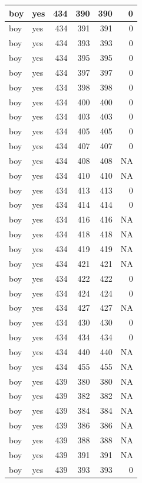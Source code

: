 \documentclass[man]{apa6}
\begin{document}
\begin{tabular}{l|l|r|r|r|r}
\hline
boy & yes & 434 & 390 & 390 & 0\\
\hline
boy & yes & 434 & 391 & 391 & 0\\
\hline
boy & yes & 434 & 393 & 393 & 0\\
\hline
boy & yes & 434 & 395 & 395 & 0\\
\hline
boy & yes & 434 & 397 & 397 & 0\\
\hline
boy & yes & 434 & 398 & 398 & 0\\
\hline
boy & yes & 434 & 400 & 400 & 0\\
\hline
boy & yes & 434 & 403 & 403 & 0\\
\hline
boy & yes & 434 & 405 & 405 & 0\\
\hline
boy & yes & 434 & 407 & 407 & 0\\
\hline
boy & yes & 434 & 408 & 408 & NA\\
\hline
boy & yes & 434 & 410 & 410 & NA\\
\hline
boy & yes & 434 & 413 & 413 & 0\\
\hline
boy & yes & 434 & 414 & 414 & 0\\
\hline
boy & yes & 434 & 416 & 416 & NA\\
\hline
boy & yes & 434 & 418 & 418 & NA\\
\hline
boy & yes & 434 & 419 & 419 & NA\\
\hline
boy & yes & 434 & 421 & 421 & NA\\
\hline
boy & yes & 434 & 422 & 422 & 0\\
\hline
boy & yes & 434 & 424 & 424 & 0\\
\hline
boy & yes & 434 & 427 & 427 & NA\\
\hline
boy & yes & 434 & 430 & 430 & 0\\
\hline
boy & yes & 434 & 434 & 434 & 0\\
\hline
boy & yes & 434 & 440 & 440 & NA\\
\hline
boy & yes & 434 & 455 & 455 & NA\\
\hline
boy & yes & 439 & 380 & 380 & NA\\
\hline
boy & yes & 439 & 382 & 382 & NA\\
\hline
boy & yes & 439 & 384 & 384 & NA\\
\hline
boy & yes & 439 & 386 & 386 & NA\\
\hline
boy & yes & 439 & 388 & 388 & NA\\
\hline
boy & yes & 439 & 391 & 391 & NA\\
\hline
boy & yes & 439 & 393 & 393 & 0\\

\end{tabular}
\end{document}
